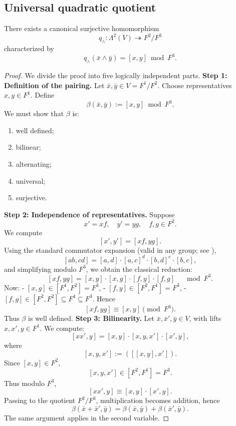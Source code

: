 \subsection*{Universal quadratic quotient}
\begin{theorem}
	There exists a canonical surjective homomorphism
	\[
		q_{\wedge}:\Lambda^2(V)\twoheadrightarrow F^2/F^3
	\]
	characterized by
	\[
		q_{\wedge}(\bar x\wedge \bar y)=[x,y]\bmod F^3.
	\]
\end{theorem}
\begin{proof}
	We divide the proof into five logically independent parts.
	\medskip
	\noindent
	\textbf{Step 1: Definition of the pairing.}
	Let \(\bar x,\bar y\in V=F^1/F^2\).
	Choose representatives \(x,y\in F^1\).
	Define
	\[
		\beta(\bar x,\bar y):=[x,y]\bmod F^3.
	\]
	We must show that \(\beta\) is:
	\begin{enumerate}
		\item well defined;
		\item bilinear;
		\item alternating;
		\item universal;
		\item surjective.
	\end{enumerate}
	\medskip
	\noindent
	\textbf{Step 2: Independence of representatives.}
	Suppose
	\[
		x'=xf,\quad y'=yg,
		\quad f,g\in F^2.
	\]
	We compute
	\[
		[x',y']=[xf,yg].
	\]
	Using the standard commutator expansion
	(valid in any group; see \cite{Hall1959}),
	\[
		[ab,cd]
		=
		[a,d]\cdot[a,c]^d\cdot[b,d]^c\cdot[b,c],
	\]
	and simplifying modulo \(F^3\), we obtain the classical reduction:
	\[
		[xf,yg]
		=
		[x,y]\cdot[x,g]\cdot[f,y]\cdot[f,g]
		\quad \mod F^3.
	\]
	Now:
	- \([x,g]\in [F^1,F^2]=F^3\),
	- \([f,y]\in [F^2,F^1]=F^3\),
	- \([f,g]\in [F^2,F^2]\subseteq F^4\subseteq F^3\).
	Hence
	\[
		[xf,yg]\equiv [x,y]\pmod{F^3}.
	\]
	Thus \(\beta\) is well defined.
	\medskip
	\noindent
	\textbf{Step 3: Bilinearity.}
	Let \(\bar x,\bar x',\bar y\in V\), with lifts \(x,x',y\in F^1\).
	We compute:
	\[
		[xx',y]
		=
		[x,y]\cdot[x,y,x']\cdot[x',y],
	\]
	where
	\[
		[x,y,x']:=([[x,y],x']).
	\]
	Since \([x,y]\in F^2\),
	\[
		[x,y,x']\in [F^2,F^1]=F^3.
	\]
	Thus modulo \(F^3\),
	\[
		[xx',y]\equiv [x,y]\cdot[x',y].
	\]
	Passing to the quotient \(F^2/F^3\), multiplication becomes addition, hence
	\[
		\beta(\bar x+\bar x',\bar y)
		=
		\beta(\bar x,\bar y)+\beta(\bar x',\bar y).
	\]
	The same argument applies in the second variable.
	\medskip

\end{proof}
